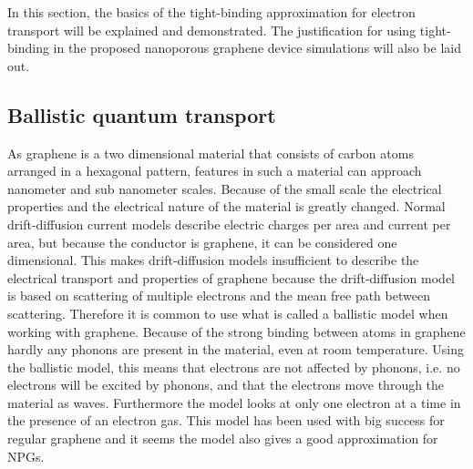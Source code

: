 In this section, the basics of the tight-binding approximation for electron transport will be explained and demonstrated. The justification for using tight-binding in the proposed nanoporous graphene device simulations will also be laid out.
\subsection{Ballistic quantum transport}
As graphene is a two dimensional material that consists of carbon atoms arranged in a hexagonal pattern, features in such a material can approach nanometer and sub nanometer scales. Because of the small scale the electrical properties and the electrical nature of the material is greatly changed. Normal drift-diffusion current models describe electric charges per area and current per area, but because the conductor is graphene, it can be considered one dimensional. This makes drift-diffusion models insufficient to describe the electrical transport and properties of graphene because the drift-diffusion model is based on scattering of multiple electrons and the mean free path between scattering. Therefore it is common to use what is called a ballistic model when working with graphene. Because of the strong binding between atoms in graphene hardly any phonons are present in the material, even at room temperature. Using the ballistic model, this means that electrons are not affected by phonons, i.e. no electrons will be excited by phonons, and that the electrons move through the material as waves. Furthermore the model looks at only one electron at a time in the presence of an electron gas. This model has been used with big success for regular graphene and it seems the model also gives a good approximation for NPGs.
